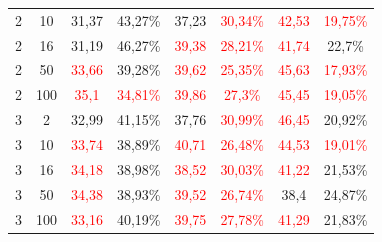 \begin{table}[ht]
\begin{tabular}{cc|cc|cc|cc}
        {2}                           & {10}    & {31,37}                             & {43,27\%}                           & {37,23}                                  & \textcolor{red}{30,34\%} & \textcolor{red}{42,53} & \textcolor{red}{19,75\%} \\
        {2}                           & {16}    & {31,19}                             & {46,27\%}                           & \textcolor{red}{39,38}                   & \textcolor{red}{28,21\%} & \textcolor{red}{41,74} & {22,7\%}                 \\
        {2}                           & {50}    & \textcolor{red}{33,66}              & {39,28\%}                           & \textcolor{red}{39,62}                   & \textcolor{red}{25,35\%} & \textcolor{red}{45,63} & \textcolor{red}{17,93\%} \\
        {2}                           & {100}   & \textcolor{red}{35,1}               & \textcolor{red}{34,81\%}            & \textcolor{red}{39,86}                   & \textcolor{red}{27,3\%}  & \textcolor{red}{45,45} & \textcolor{red}{19,05\%} \\
        {3}                           & {2}     & {32,99}                             & {41,15\%}                           & {37,76}                                  & \textcolor{red}{30,99\%} & \textcolor{red}{46,45} & {20,92\%}                \\
        {3}                           & {10}    & \textcolor{red}{33,74}              & {38,89\%}                           & \textcolor{red}{40,71}                   & \textcolor{red}{26,48\%} & \textcolor{red}{44,53} & \textcolor{red}{19,01\%} \\
        {3}                           & {16}    & \textcolor{red}{34,18}              & {38,98\%}                           & \textcolor{red}{38,52}                   & \textcolor{red}{30,03\%} & \textcolor{red}{41,22} & {21,53\%}                \\
        {3}                           & {50}    & \textcolor{red}{34,38}              & {38,93\%}                           & \textcolor{red}{39,52}                   & \textcolor{red}{26,74\%} & {38,4}                 & {24,87\%}                \\
        {3}                           & {100}   & \textcolor{red}{33,16}              & {40,19\%}                           & \textcolor{red}{39,75}                   & \textcolor{red}{27,78\%} & \textcolor{red}{41,29} & {21,83\%}                \\

\end{tabular}
\end{table}
